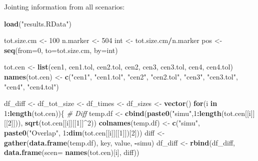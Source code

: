 \documentclass[]{article}
\newenvironment{Shaded}{\begin{snugshade}}{\end{snugshade}}
\newcommand{\CommentTok}[1]{\textcolor[rgb]{0.56,0.35,0.01}{\textit{#1}}}
\newcommand{\ControlFlowTok}[1]{\textcolor[rgb]{0.13,0.29,0.53}{\textbf{#1}}}
\newcommand{\DataTypeTok}[1]{\textcolor[rgb]{0.13,0.29,0.53}{#1}}
\newcommand{\DecValTok}[1]{\textcolor[rgb]{0.00,0.00,0.81}{#1}}
\newcommand{\KeywordTok}[1]{\textcolor[rgb]{0.13,0.29,0.53}{\textbf{#1}}}
\newcommand{\NormalTok}[1]{#1}
\newcommand{\OperatorTok}[1]{\textcolor[rgb]{0.81,0.36,0.00}{\textbf{#1}}}
\newcommand{\StringTok}[1]{\textcolor[rgb]{0.31,0.60,0.02}{#1}}
\begin{document}
Jointing information from all scenarios:

\begin{Shaded}
\begin{Highlighting}[]
\KeywordTok{load}\NormalTok{(}\StringTok{"results.RData"}\NormalTok{)}

\NormalTok{tot.size.cm <-}\StringTok{ }\DecValTok{100}
\NormalTok{n.marker <-}\StringTok{ }\DecValTok{504}
\NormalTok{int <-}\StringTok{ }\NormalTok{tot.size.cm}\OperatorTok{/}\NormalTok{n.marker}
\NormalTok{pos <-}\StringTok{ }\KeywordTok{seq}\NormalTok{(}\DataTypeTok{from=}\DecValTok{0}\NormalTok{, }\DataTypeTok{to=}\NormalTok{tot.size.cm, }\DataTypeTok{by=}\NormalTok{int)}

\NormalTok{tot.cen <-}\StringTok{ }\KeywordTok{list}\NormalTok{(cen1, cen1.tol, cen2.tol, cen2, cen3, cen3.tol, cen4, cen4.tol)}
\KeywordTok{names}\NormalTok{(tot.cen) <-}\StringTok{ }\KeywordTok{c}\NormalTok{(}\StringTok{"cen1"}\NormalTok{, }\StringTok{"cen1.tol"}\NormalTok{, }\StringTok{"cen2"}\NormalTok{, }\StringTok{"cen2.tol"}\NormalTok{, }
                    \StringTok{"cen3"}\NormalTok{, }\StringTok{"cen3.tol"}\NormalTok{, }\StringTok{"cen4"}\NormalTok{, }\StringTok{"cen4.tol"}\NormalTok{)}

\NormalTok{df_diff <-}\StringTok{ }\NormalTok{df_tot_size <-}\StringTok{ }\NormalTok{df_times <-}\StringTok{ }\NormalTok{df_sizes <-}\StringTok{  }\KeywordTok{vector}\NormalTok{()}
\ControlFlowTok{for}\NormalTok{(i }\ControlFlowTok{in} \DecValTok{1}\OperatorTok{:}\KeywordTok{length}\NormalTok{(tot.cen))\{}
  \CommentTok{# Diff}
\NormalTok{  temp.df <-}\StringTok{ }\KeywordTok{cbind}\NormalTok{(}\KeywordTok{paste0}\NormalTok{(}\StringTok{"simu"}\NormalTok{,}\DecValTok{1}\OperatorTok{:}\KeywordTok{length}\NormalTok{(tot.cen[[i]][[}\DecValTok{2}\NormalTok{]])), }
                   \KeywordTok{sqrt}\NormalTok{(tot.cen[[i]][[}\DecValTok{1}\NormalTok{]]}\OperatorTok{^}\DecValTok{2}\NormalTok{))}
  \KeywordTok{colnames}\NormalTok{(temp.df) <-}\StringTok{ }\KeywordTok{c}\NormalTok{(}\StringTok{"simu"}\NormalTok{, }\KeywordTok{paste0}\NormalTok{(}\StringTok{"Overlap"}\NormalTok{, }
                                        \DecValTok{1}\OperatorTok{:}\KeywordTok{dim}\NormalTok{(tot.cen[[i]][[}\DecValTok{1}\NormalTok{]])[}\DecValTok{2}\NormalTok{]))}
\NormalTok{  diff <-}\StringTok{ }\KeywordTok{gather}\NormalTok{(}\KeywordTok{data.frame}\NormalTok{(temp.df), key, value, }\OperatorTok{-}\NormalTok{simu)}
\NormalTok{  df_diff <-}\StringTok{ }\KeywordTok{rbind}\NormalTok{(df_diff, }\KeywordTok{data.frame}\NormalTok{(}\DataTypeTok{scen=} \KeywordTok{names}\NormalTok{(tot.cen)[i], diff))}
  

\end{Highlighting}
\end{Shaded}
\end{document}
